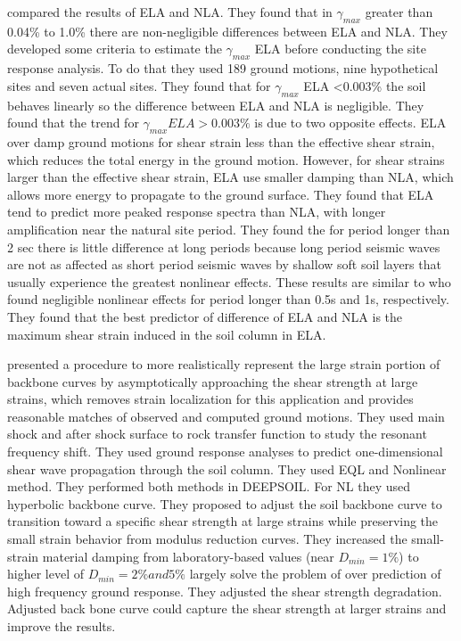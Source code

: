 \citet{Carlton2016comparison} compared the results of ELA and NLA. They found that in $\gamma_{max}$ greater than 0.04\% to 1.0\% there are non-negligible differences between ELA and NLA. They developed some criteria to estimate the $\gamma_{max}$ ELA before conducting the site response analysis. To do that they used 189 ground motions, nine hypothetical sites and seven actual sites. They found that for $\gamma_{max}$ ELA <0.003\% the soil behaves linearly so the difference between ELA and NLA is negligible. They found that the trend for  $\gamma_{max}ELA > 0.003\%$ is due to two opposite effects. ELA over damp ground motions for shear strain less than the effective shear strain, which reduces the total energy in the ground motion. However, for shear strains larger than the effective shear strain, ELA use smaller damping than NLA, which allows more energy to propagate to the ground surface. They found that ELA tend to predict more peaked response spectra than NLA, with longer amplification near the natural site period. They found the for period longer than 2 sec there is little difference at long periods because long period seismic waves are not as affected as short period seismic waves by shallow soft soil layers that usually experience the greatest nonlinear effects. These results are similar to \citet{Kaklamanos2013,Kim2013site} who found negligible nonlinear effects for period longer than 0.5s and 1s, respectively. They found that the best predictor of difference of ELA and NLA is the maximum shear strain induced in the soil column in ELA.

\citet{Yee2013elastic} presented a procedure to more realistically represent the large strain portion of backbone curves by asymptotically approaching the shear strength at large strains, which removes strain localization for this application and provides reasonable matches of observed and computed ground motions. They used main shock and after shock surface to rock transfer function to study the resonant frequency shift. They used ground response analyses to predict one-dimensional shear wave propagation through the soil column. They used EQL and Nonlinear method. They performed both methods in DEEPSOIL. For NL they used hyperbolic backbone curve. They proposed to adjust the soil backbone curve to transition toward a specific shear strength at large strains while preserving the small strain behavior from modulus reduction curves. They increased the small-strain material damping from laboratory-based values (near $D_{min}=1\%$) to higher level of $D_{min}=2\% and 5\%$ largely solve the problem of over prediction of high frequency ground response. They adjusted the shear strength degradation. Adjusted back bone curve could capture the shear strength at larger strains and improve the results.\\

